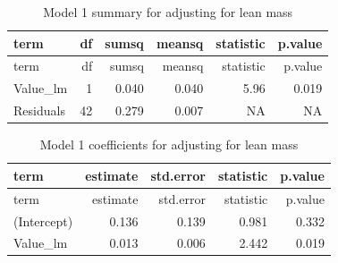 \documentclass[]{article}
\newenvironment{Shaded}{\begin{snugshade}}{\end{snugshade}}
\newcommand{\CommentTok}[1]{\textcolor[rgb]{0.56,0.35,0.01}{\textit{#1}}}
\newcommand{\DataTypeTok}[1]{\textcolor[rgb]{0.13,0.29,0.53}{#1}}
\newcommand{\FloatTok}[1]{\textcolor[rgb]{0.00,0.00,0.81}{#1}}
\newcommand{\KeywordTok}[1]{\textcolor[rgb]{0.13,0.29,0.53}{\textbf{#1}}}
\newcommand{\NormalTok}[1]{#1}
\newcommand{\OperatorTok}[1]{\textcolor[rgb]{0.81,0.36,0.00}{\textbf{#1}}}
\newcommand{\StringTok}[1]{\textcolor[rgb]{0.31,0.60,0.02}{#1}}
\begin{document}
\begin{Shaded}
\end{Shaded}

\begin{longtable}[]{@{}lrrrrr@{}}
\caption{Model 1 summary for adjusting for lean mass}\tabularnewline
\toprule
term & df & sumsq & meansq & statistic & p.value\tabularnewline
\midrule
\endfirsthead
\toprule
term & df & sumsq & meansq & statistic & p.value\tabularnewline
\midrule
\endhead
Value\_lm & 1 & 0.040 & 0.040 & 5.96 & 0.019\tabularnewline
Residuals & 42 & 0.279 & 0.007 & NA & NA\tabularnewline
\bottomrule
\end{longtable}

\begin{Shaded}
\end{Shaded}

\begin{longtable}[]{@{}lrrrr@{}}
\caption{Model 1 coefficients for adjusting for lean
mass}\tabularnewline
\toprule
term & estimate & std.error & statistic & p.value\tabularnewline
\midrule
\endfirsthead
\toprule
term & estimate & std.error & statistic & p.value\tabularnewline
\midrule
\endhead
(Intercept) & 0.136 & 0.139 & 0.981 & 0.332\tabularnewline
Value\_lm & 0.013 & 0.006 & 2.442 & 0.019\tabularnewline
\bottomrule
\end{longtable}
\end{document}
